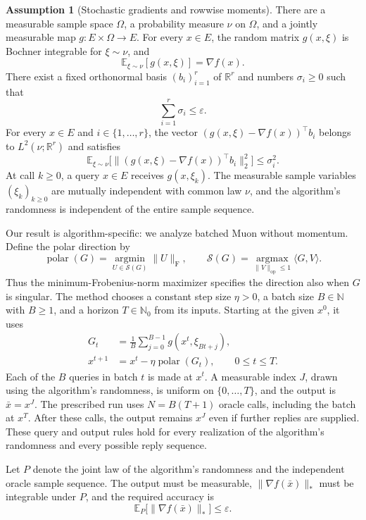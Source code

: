 \documentclass[10pt]{article}
\theoremstyle{definition}
\newtheorem{assumption}{Assumption}
\begin{document}
\begin{assumption}[Stochastic gradients and rowwise moments]
There are a measurable sample space $\Omega$, a probability measure $\nu$ on $\Omega$, and a jointly measurable map $g:E\times\Omega\to E$. For every $x\in E$, the random matrix $g(x,\xi)$ is Bochner integrable for $\xi\sim\nu$, and
\[
\mathbb{E}_{\xi\sim\nu}[g(x,\xi)]=\nabla f(x).
\]
There exist a fixed orthonormal basis $(b_i)_{i=1}^r$ of $\mathbb{R}^r$ and numbers $\sigma_i\geq0$ such that
\[
\sum_{i=1}^r\sigma_i\leq\varepsilon.
\]
For every $x\in E$ and $i\in\{1,\ldots,r\}$, the vector $(g(x,\xi)-\nabla f(x))^\top b_i$ belongs to $L^2(\nu;\mathbb{R}^r)$ and satisfies
\[
\mathbb{E}_{\xi\sim\nu}
\bigl[\|(g(x,\xi)-\nabla f(x))^\top b_i\|_2^2\bigr]
\leq\sigma_i^2.
\]
At call $k\geq0$, a query $x\in E$ receives $g(x,\xi_k)$. The measurable sample variables $(\xi_k)_{k\geq0}$ are mutually independent with common law $\nu$, and the algorithm's randomness is independent of the entire sample sequence.
\end{assumption}

Our result is algorithm-specific: we analyze batched Muon without momentum. Define the polar direction by
\[
\operatorname{polar}(G)
=
\underset{U\in\mathcal{S}(G)}{\operatorname{argmin}}
\|U\|_{\mathrm F},
\qquad
\mathcal{S}(G)
=
\underset{\|V\|_{\mathrm{op}}\leq1}{\operatorname{argmax}}
\langle G,V\rangle.
\]
Thus the minimum-Frobenius-norm maximizer specifies the direction also when $G$ is singular. The method chooses a constant step size $\eta>0$, a batch size $B\in\mathbb{N}$ with $B\geq1$, and a horizon $T\in\mathbb{N}_0$ from its inputs. Starting at the given $x^0$, it uses
\[
\begin{aligned}
G_t&=\frac1B\sum_{j=0}^{B-1}g(x^t,\xi_{Bt+j}),\\
x^{t+1}&=x^t-\eta\operatorname{polar}(G_t),
\qquad 0\leq t\leq T.
\end{aligned}
\]
Each of the $B$ queries in batch $t$ is made at $x^t$. A measurable index $J$, drawn using the algorithm's randomness, is uniform on $\{0,\ldots,T\}$, and the output is $\bar{x}=x^J$. The prescribed run uses $N=B(T+1)$ oracle calls, including the batch at $x^T$. After these calls, the output remains $x^J$ even if further replies are supplied. These query and output rules hold for every realization of the algorithm's randomness and every possible reply sequence.

Let $P$ denote the joint law of the algorithm's randomness and the independent oracle sample sequence. The output must be measurable, $\|\nabla f(\bar{x})\|_*$ must be integrable under $P$, and the required accuracy is
\[
\mathbb{E}_{P}\bigl[\|\nabla f(\bar{x})\|_*\bigr]
\leq\varepsilon.
\]
\end{document}
